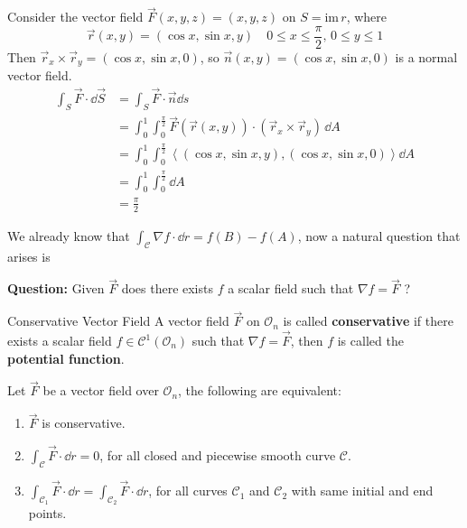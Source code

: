 \documentclass[Analysis-3]{subfiles}
\begin{document}
\begin{Eg}{}{}
    Consider the vector field $\vec{F}(x,y,z) = (x,y,z)$ on $S = \mathrm{im} \, r$, where 
    \[
        \vec{r}(x,y) = (\cos x, \sin x, y) \quad 0 \leq x \leq \frac{\pi}{2}, \, 0 \leq y \leq 1    
    \]
    Then $\vec{r}_x \times \vec{r}_y = (\cos x, \sin x, 0)$, so $\vec{n}(x,y) = (\cos x, \sin x, 0)$ is a normal vector field. 
    \begin{align*}
        \int_S \vec{F} \cdot \dd \vec{S} &= \int_S \vec{F} \cdot \vec{n} \dd s \\ 
        &= \int_0^1 \int_0^{\frac{\pi}{2}} \vec{F}(\vec{r}(x,y)) \cdot (\vec{r}_x \times \vec{r}_y) \, \dd A \\ 
        &= \int_0^1 \int_0^{\frac{\pi}{2}} \left\langle (\cos x, \sin x , y) , (\cos x, \sin x, 0)\right\rangle \dd A \\ 
        &= \int_0^1 \int_{0}^{\frac{\pi}{2}} \dd A \\ 
        &= \frac{\pi}{2} 
    \end{align*}
\end{Eg}

We already know that $\int_{\mathcal{C}} \nabla f \cdot \dd r = f(B) - f(A)$, now a natural question that arises is 

\textbf{Question:} Given $\vec{F}$ does there exists $f$ a scalar field such that $\nabla f = \vec{F}$ ?  

\begin{Def}{Conservative Vector Field}{}
    A vector field $\vec{F}$ on $\mathcal{O}_n$ is called \textbf{conservative} if there exists a scalar field $f \in \mathscr{C}^1(\mathcal{O}_n)$ such that $\nabla f = \vec{F}$, then $f$ is called the \textbf{potential function}. 
\end{Def}

\begin{Thm}{}{}\label{thm1:27}
    Let $\vec{F}$ be a vector field over $\mathcal{O}_n$, the following are equivalent: 
    \begin{enumerate}
        \item $\vec{F}$ is conservative.
        \item $\int_{\mathcal{C}}\vec{F} \cdot \dd r = 0$, for all closed and piecewise smooth curve $\mathcal{C}$.
        \item $\int_{\mathcal{C}_1} \vec{F} \cdot \dd r = \int_{\mathcal{C}_2} \vec{F} \cdot \dd r$, for all curves $\mathcal{C}_1$ and $\mathcal{C}_2$ with same initial and end points.
    \end{enumerate}
\end{Thm}
\end{document}
